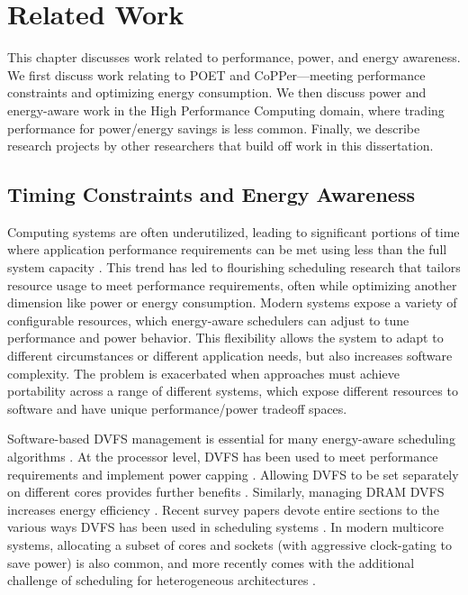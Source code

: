 \chapter{Related Work}
\label{sec:related}

This chapter discusses work related to performance, power, and energy awareness.
We first discuss work relating to POET and CoPPer---meeting performance constraints and optimizing energy consumption.
We then discuss power and energy-aware work in the High Performance Computing domain, where trading performance for power/energy savings is less common.
Finally, we describe research projects by other researchers that build off work in this dissertation.


\section{Timing Constraints and Energy Awareness}

Computing systems are often underutilized, leading to significant portions of time where application performance requirements can be met using less than the full system capacity \cite{google,MeisnerISCA2011}.
This trend has led to flourishing scheduling research that tailors resource usage to meet performance requirements, often while optimizing another dimension like power or energy consumption.
Modern systems expose a variety of configurable resources, which energy-aware schedulers can adjust to tune performance and power behavior.
This flexibility allows the system to adapt to different circumstances or different application needs, but also increases software complexity.
The problem is exacerbated when approaches must achieve portability across a range of different systems, which expose different resources to software and have unique performance/power tradeoff spaces.

Software-based DVFS management is essential for many energy-aware scheduling algorithms \cite{Albers,YDS}.
At the processor level, DVFS has been used to meet performance requirements \cite{Lu2002,Wu2004} and implement power capping \cite{lefurgy2008power}.
Allowing DVFS to be set separately on different cores provides further benefits \cite{Isci2006,Rangan2009}.
Similarly, managing DRAM DVFS increases energy efficiency \cite{Memscale,Diniz2007}.
Recent survey papers devote entire sections to the various ways DVFS has been used in scheduling systems \cite{MittalSurvey,ZhuralevSurvey}.
In modern multicore systems, allocating a subset of cores and sockets (with aggressive clock-gating to save power) is also common, and more recently comes with the additional challenge of scheduling for heterogeneous architectures \cite{Petrucci2012}.

